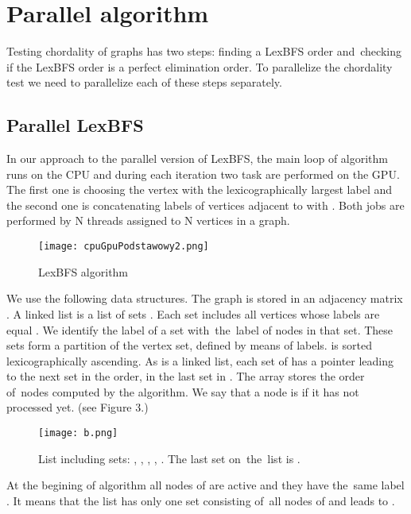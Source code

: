 \documentclass[a4paper, 11pt]{article}
\begin{document}
\section{Parallel algorithm}

Testing chordality of graphs has two steps: finding a LexBFS order and~checking if the LexBFS 
order is a perfect elimination order. To parallelize the chordality test we need to parallelize 
each of these steps separately. 

\subsection{Parallel LexBFS}

In our approach to the parallel version of LexBFS, the main loop of algorithm runs on the CPU and 
during each iteration  two task are performed on the GPU. The first one is choosing the vertex 
 with the lexicographically largest label and the second one is concatenating labels of vertices 
adjacent to  with . Both jobs are performed by N threads assigned to N vertices in a graph.

\begin{figure}[h]
    \begin{center}
        \texttt{[image: cpuGpuPodstawowy2.png]}
        \caption{LexBFS algorithm}
    \end{center}
\end{figure}

    
We use the following data structures. The graph  is stored in an adjacency matrix . 
A linked list  is a list of sets . Each set  includes all vertices whose labels 
are equal . We identify the label of a set with~the~label of nodes in that set. These sets
form a partition of the vertex set, defined by means of labels.  is sorted lexicographically 
ascending. As  is a linked list, each set of  has a pointer  leading to the next 
set in the order,  in the last set in . The  array stores the order 
of~nodes computed by the algorithm. We say that a node is  if it has not processed yet.
(see Figure 3.)

\begin{figure}[h!]
    \begin{center}
        \texttt{[image: b.png]}
        \caption{List  including sets: , , , , . 
            The last set on~the~list is .}
    \end{center}
\end{figure}

At the begining of algorithm all nodes of  are active and they have the~same label . 
It means that the list  has only one set  consisting of~all nodes of  and 
 leads to .
\end{document}
